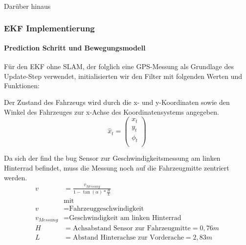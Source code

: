 \documentclass[11pt]{article}
\begin{document}
Darüber hinaus

\subsubsection{EKF Implementierung}
\paragraph{Prediction Schritt und Bewegungsmodell}
Für den EKF ohne SLAM, der folglich eine GPS-Messung als Grundlage des Update-Step verwendet, initialisierten wir den Filter mit folgenden Werten und Funktionen:

Der Zustand des Fahrzeugs wird durch die x- und y-Koordinaten sowie den Winkel des Fahrzeuges zur x-Achse des Koordinatensystems angegeben.
\begin{equation}\label{EKF-State-Vector}
	\hat{x}_t = \begin{pmatrix}
		x_t \\
		y_t \\
		\phi_t \\
	  \end{pmatrix}
\end{equation}

Da sich der find the bug Sensor zur Geschwindigkeitsmessung am linken Hinterrad befindet, muss die Messung noch auf die Fahrzeugmitte zentriert werden.
\begin{equation}\label{Geschwindikeit}
\begin{split}
	v &= \frac{v_{Messung}}{1-\tan(\alpha)*\frac{H}{L}} \\
	&\text{mit } \\
	v &= \text{Fahrzeuggeschwindigkeit} \\
	v_{Messung} &= \text{Geschwindigkeit am linken Hinterrad} \\
	H &= \text{Achsabstand Sensor zur Fahrzeugmitte} = 0,76m \\
	L &= \text{Abstand Hinterachse zur Vorderache} = 2,83m
\end{split}
\end{equation}
\end{document}
